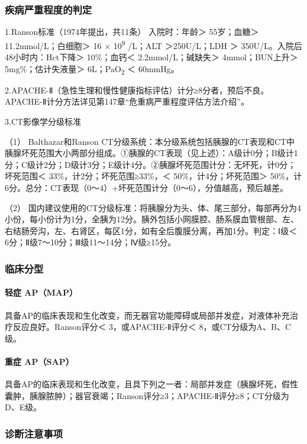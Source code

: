 \subsubsection{疾病严重程度的判定}

1.Ranson标准（1974年提出，共11条） 入院时：年龄＞ 55岁；血糖＞
11.2mmol/L；白细胞＞ 16 × 10\textsuperscript{9} /L；ALT ＞250U/L；LDH ＞
350U/L。入院后48小时内：Hct下降＞ 10\%；血钙＜ 2.2mmol/L；碱缺失＞
4mmol；BUN上升＞ 5mg\%；估计失液量＞ 6L；PaO\textsubscript{2} ＜
60mmHg。

2.APACHE-Ⅱ（急性生理和慢性健康指标评估）计分≥8分者，预后不良。APACHE-Ⅱ计分方法详见第147章“危重病严重程度评估方法介绍”。

3.CT影像学分级标准

（1） Balthazar和Ranson
CT分级系统：本分级系统包括胰腺的CT表现和CT中胰腺坏死范围大小两部分组成。①胰腺的CT表现（见上述）：A级计0分；B级计1分；C级计2分；D级计3分；E级计4分。②胰腺坏死范围计分：无坏死，计0分；坏死范围＜
33\%，计2分；坏死范围≥33\%，＜ 50\%，计4分；坏死范围＞
50\%，计6分。总分：CT表现（0～4）+坏死范围计分（0～6），分值越高，预后越差。

（2）
国内建议使用的CT分级标准：将胰腺分为头、体、尾三部分，每部再分为4小份，每小份计为1分，全胰为12分。胰外包括小网膜腔、肠系膜血管根部、左、右结肠旁沟，左、右肾区，每区1分，如有全后腹膜分离，再加1分。判定：Ⅰ级＜
6分；Ⅱ级7～10分；Ⅲ级11～14分；Ⅳ级≥15分。

\subsubsection{临床分型}

\paragraph{轻症 AP（MAP）}

具备AP的临床表现和生化改变，而无器官功能障碍或局部并发症，对液体补充治疗反应良好。Ranson评分＜
3，或APACHE-Ⅱ评分＜ 8，或CT分级为A、B、C级。

\paragraph{重症 AP（SAP）}

具备AP的临床表现和生化改变，且具下列之一者：局部并发症（胰腺坏死，假性囊肿，胰腺脓肿）；器官衰竭；Ranson评分≥3；APACHE-Ⅱ评分≥8；CT分级为D、E级。

\subsubsection{诊断注意事项}

